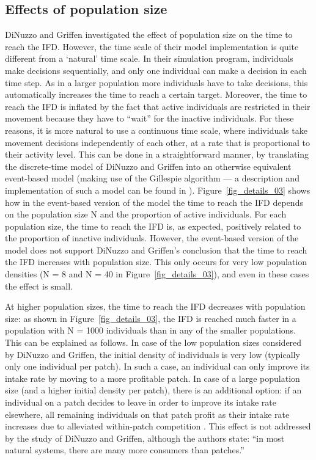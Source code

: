\begin{interludeenv}
	\subsection*{Effects of population size}
	
	DiNuzzo and Griffen investigated the effect of population size on the time to reach the IFD.
	However, the time scale of their model implementation is quite different from a `natural' time scale.
	In their simulation program, individuals make decisions sequentially, and only one individual can make a decision in each time step.
	As in a larger population more individuals have to take decisions, this automatically increases the time to reach a certain target.
	Moreover, the time to reach the IFD is inflated by the fact that active individuals are restricted in their movement because they have to ``wait'' for the inactive individuals.
	For these reasons, it is more natural to use a continuous time scale, where individuals take movement decisions independently of each other, at a rate that is proportional to their activity level.
	This can be done in a straightforward manner, by translating the discrete-time model of DiNuzzo and Griffen into an otherwise equivalent event-based model (making use of the Gillespie algorithm  --- a description and implementation of such a model can be found in \textcite{netz2021a}).
	Figure~\ref{fig_details_03} shows how in the event-based version of the model the time to reach the IFD depends on the population size N and the proportion of active individuals.
	For each population size, the time to reach the IFD is, as expected, positively related to the proportion of inactive individuals.
	However, the event-based version of the model does not support DiNuzzo and Griffen's conclusion that the time to reach the IFD increases with population size.
	This only occurs for very low population densities (N = 8 and N = 40 in Figure~\ref{fig_details_03}), and even in these cases the effect is small.

	At higher population sizes, the time to reach the IFD decreases with population size: as shown in Figure~\ref{fig_details_03}, the IFD is reached much faster in a population with N = 1000 individuals than in any of the smaller populations.
	This can be explained as follows.
	In case of the low population sizes considered by DiNuzzo and Griffen, the initial density of individuals is very low (typically only one individual per patch).
	In such a case, an individual can only improve its intake rate by moving to a more profitable patch.
	In case of a large population size (and a higher initial density per patch), there is an additional option: if an individual on a patch decides to leave in order to improve its intake rate elsewhere, all remaining individuals on that patch profit as their intake rate increases due to alleviated within-patch competition .
	This effect is not addressed by the study of DiNuzzo and Griffen, although the authors state: ``in most natural systems, there are many more consumers than patches.'' 


\end{interludeenv}

